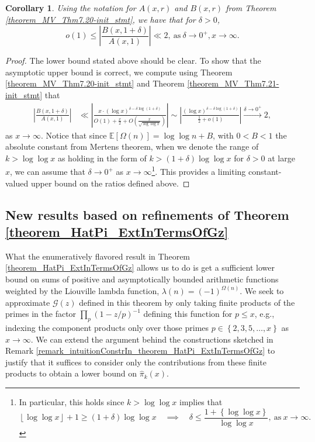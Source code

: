 \documentclass[11pt,reqno,a4letter]{article}
\numberwithin{figure}{section}
\numberwithin{table}{section}
\newcommand{\floor}[1]{\left\lfloor #1 \right\rfloor}
\theoremstyle{plain}
\newtheorem{cor}[theorem]{Corollary}
\numberwithin{theorem}{section}
\theoremstyle{definition}
\begin{document}
\begin{cor} 
\label{theorem_MV_Thm7.20} 
Using the notation for $A(x, r)$ and $B(x, r)$ from 
Theorem \ref{theorem_MV_Thm7.20-init_stmt}, 
we have that for $\delta > 0$, 
\[
o(1) \leq \left\lvert \frac{B(x, 1+\delta)}{A(x, 1)} \right\rvert \ll 2, 
     \mathrm{\ as\ } \delta \rightarrow 0^{+}, x \rightarrow \infty. 
\]
\end{cor} 
\begin{proof} 
The lower bound stated above should be clear. To show that the asymptotic 
upper bound is correct, we compute using Theorem \ref{theorem_MV_Thm7.20-init_stmt} and 
Theorem \ref{theorem_MV_Thm7.21-init_stmt} that 
\begin{align*} 
\left\lvert \frac{B(x, 1+\delta)}{A(x, 1)} \right\rvert & \ll 
     \left\lvert \frac{x \cdot (\log x)^{\delta - \delta\log(1+\delta)}}{ 
     O(1) + \frac{x}{2} + 
     O\left(\frac{x}{\sqrt{\log\log x}}\right)} \right\rvert 
     \sim 
     \left\lvert \frac{(\log x)^{\delta - \delta\log(1+\delta)}}{ 
     \frac{1}{2} + o(1)}\right\rvert 
     \xrightarrow{\delta \rightarrow 0^{+}} 2, 
\end{align*} 
as $x \rightarrow \infty$. Notice that since $\mathbb{E}[\Omega(n)] = \log\log n + B$, with $0 < B < 1$ the 
absolute constant from Mertens theorem, 
when we denote the range of $k > \log\log x$ as holding in the form of 
$k > (1 + \delta) \log\log x$ for $\delta > 0$ at large $x$, we can assume that 
$\delta \rightarrow 0^{+}$ as $x \rightarrow \infty$\footnote{
     In particular, this holds since $k > \log\log x$ implies that 
     \[
     \floor{\log\log x} + 1 \geq (1 + \delta) \log\log x \quad\implies\quad 
          \delta \leq \frac{1 + \left\{\log\log x\right\}}{\log\log x}, 
          \mathrm{\ as\ } x \rightarrow \infty. 
     \]
}. This provides a limiting constant-valued 
upper bound on the ratios defined above. 
\end{proof} 

\subsection{New results based on refinements of Theorem \ref{theorem_HatPi_ExtInTermsOfGz}} 
\label{subSection_PartialPrimeProducts_Proofs} 

What the enumeratively flavored result 
in Theorem \ref{theorem_HatPi_ExtInTermsOfGz} allows us to do is get a 
sufficient lower bound on sums of positive and asymptotically bounded arithmetic functions 
weighted by the Liouville lambda function, $\lambda(n) = (-1)^{\Omega(n)}$. 
We seek to approximate $\mathcal{G}(z)$ defined in this theorem 
by only taking finite products of the primes in the factor 
$\prod_{p} (1 - z/p)^{-1}$ defining this function for 
$p \leq x$, e.g., indexing the component products only over those primes 
$p \in \left\{2,3,5,\ldots,x\right\}$ as $x \rightarrow \infty$. 
We can extend the argument behind the constructions sketched in 
Remark \ref{remark_intuitionConstrIn_theorem_HatPi_ExtInTermsOfGz} to 
justify that it suffices to consider only the contributions from 
these finite products to obtain a lower bound on $\widehat{\pi}_k(x)$. 
\end{document}
